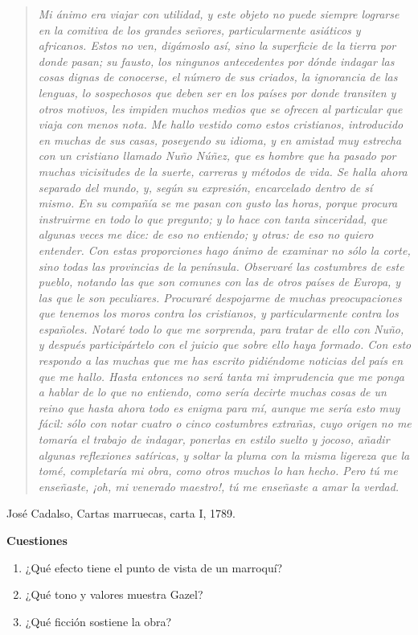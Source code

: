 \documentclass{book}
\begin{document}
\begin{tcolorbox}[title={Ejercicios}, studiumworked, breakable]
\begin{quote}
\itshape Mi ánimo era viajar con utilidad, y este objeto no puede siempre lograrse en la comitiva de los grandes señores, particularmente asiáticos y africanos. Estos no ven, digámoslo así, sino la superficie de la tierra por donde pasan; su fausto, los ningunos antecedentes por dónde indagar las cosas dignas de conocerse, el número de sus criados, la ignorancia de las lenguas, lo sospechosos que deben ser en los países por donde transiten y otros motivos, les impiden muchos medios que se ofrecen al particular que viaja con menos nota. Me hallo vestido como estos cristianos, introducido en muchas de sus casas, poseyendo su idioma, y en amistad muy estrecha con un cristiano llamado Nuño Núñez, que es hombre que ha pasado por muchas vicisitudes de la suerte, carreras y métodos de vida. Se halla ahora separado del mundo, y, según su expresión, encarcelado dentro de sí mismo. En su compañía se me pasan con gusto las horas, porque procura instruirme en todo lo que pregunto; y lo hace con tanta sinceridad, que algunas veces me dice: de eso no entiendo; y otras: de eso no quiero entender. Con estas proporciones hago ánimo de examinar no sólo la corte, sino todas las provincias de la península. Observaré las costumbres de este pueblo, notando las que son comunes con las de otros países de Europa, y las que le son peculiares. Procuraré despojarme de muchas preocupaciones que tenemos los moros contra los cristianos, y particularmente contra los españoles. Notaré todo lo que me sorprenda, para tratar de ello con Nuño, y después participártelo con el juicio que sobre ello haya formado. Con esto respondo a las muchas que me has escrito pidiéndome noticias del país en que me hallo. Hasta entonces no será tanta mi imprudencia que me ponga a hablar de lo que no entiendo, como sería decirte muchas cosas de un reino que hasta ahora todo es enigma para mí, aunque me sería esto muy fácil: sólo con notar cuatro o cinco costumbres extrañas, cuyo origen no me tomaría el trabajo de indagar, ponerlas en estilo suelto y jocoso, añadir algunas reflexiones satíricas, y soltar la pluma con la misma ligereza que la tomé, completaría mi obra, como otros muchos lo han hecho. Pero tú me enseñaste, ¡oh, mi venerado maestro!, tú me enseñaste a amar la verdad.
\end{quote}
{\noindent\footnotesize José Cadalso, Cartas marruecas, carta I, 1789.\par}

\noindent\textbf{Cuestiones}
\begin{enumerate}
\item ¿Qué efecto tiene el punto de vista de un marroquí?
\item ¿Qué tono y valores muestra Gazel?
\item ¿Qué ficción sostiene la obra?
\end{enumerate}


\end{tcolorbox}
\end{document}
